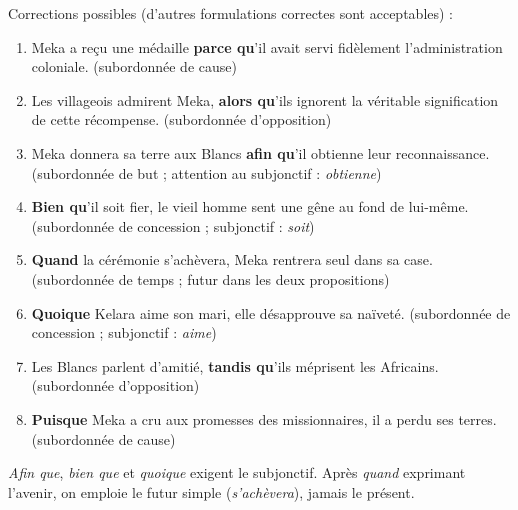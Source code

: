 \documentclass[11pt]{article}
\newcommand{\cle}[1]{{\popxbold\color{popdark}#1}}
\begin{document}
\begin{corrige}
Corrections possibles (d'autres formulations correctes sont acceptables) :
\begin{enumerate}
\item Meka a reçu une médaille \textbf{parce qu}'il avait servi fidèlement l'administration coloniale. (subordonnée de cause)
\item Les villageois admirent Meka, \textbf{alors qu}'ils ignorent la véritable signification de cette récompense. (subordonnée d'opposition)
\item Meka donnera sa terre aux Blancs \textbf{afin qu}'il obtienne leur reconnaissance. (subordonnée de but ; attention au subjonctif : \emph{obtienne})
\item \textbf{Bien qu}'il soit fier, le vieil homme sent une gêne au fond de lui-même. (subordonnée de concession ; subjonctif : \emph{soit})
\item \textbf{Quand} la cérémonie s'achèvera, Meka rentrera seul dans sa case. (subordonnée de temps ; futur dans les deux propositions)
\item \textbf{Quoique} Kelara aime son mari, elle désapprouve sa naïveté. (subordonnée de concession ; subjonctif : \emph{aime})
\item Les Blancs parlent d'amitié, \textbf{tandis qu}'ils méprisent les Africains. (subordonnée d'opposition)
\item \textbf{Puisque} Meka a cru aux promesses des missionnaires, il a perdu ses terres. (subordonnée de cause)
\end{enumerate}
\begin{attention}
\emph{Afin que}, \emph{bien que} et \emph{quoique} exigent le \cle{subjonctif}. Après \emph{quand} exprimant l'avenir, on emploie le futur simple (\emph{s'achèvera}), jamais le présent.
\end{attention}
\end{corrige}
\end{document}
